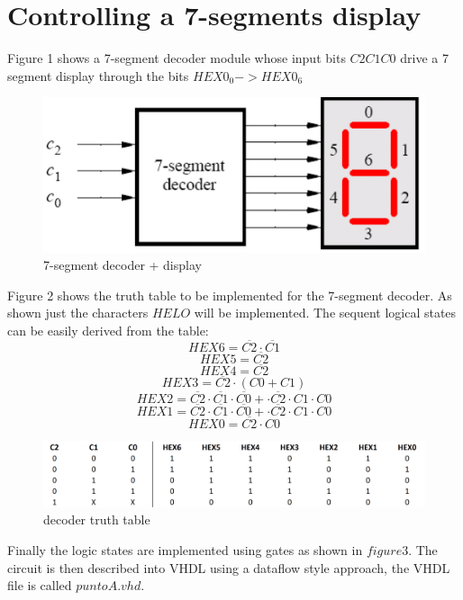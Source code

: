 \documentclass[12pt]{article}
\begin{document}

\section{ Controlling a 7-segments display}

	Figure 1 shows a 7-segment decoder module whose input bits $C2 C1 C0$ drive a 7 segment display through the bits $HEX0_{0}->HEX0_{6}$ 
	
	\begin{figure}[h]
		\centering
		\includegraphics[scale = 0.7]{Niki_puntoA/system.png}
		\caption{7-segment decoder + display}
	\end{figure}	

	Figure 2 shows the truth table to be implemented for the 7-segment decoder. As shown just the characters $H E L O$ will be implemented.
	The sequent logical states can be easily derived from the table:
	\[HEX6=\overline{C2}\cdot\overline{C1}\]
	\[HEX5=\overline{C2}\]
	\[HEX4=\overline{C2}\]
	\[HEX3=\overline{C2}\cdot(C0+C1)\]
	\[HEX2=\overline{C2}\cdot\overline{C1}\cdot\overline{C0}+\cdot\overline{C2}\cdot C1\cdot C0\]
	\[HEX1=\overline{C2}\cdot\overline{C1}\cdot\overline{C0}+\cdot\overline{C2}\cdot C1\cdot C0\]
	\[HEX0=\overline{C2}\cdot C0\]
	

	\begin{figure}[h]
		\centering
	 	\includegraphics[scale = 0.45]{Niki_puntoA/tabella.png}
	 	\caption{decoder truth table}
	\end{figure}	
	 
	 Finally the logic states are implemented using gates as shown in $figure 3$.\newline
	 The circuit is then described into VHDL using a dataflow style approach, the VHDL file is called $puntoA.vhd$. 
	 
\end{document}

